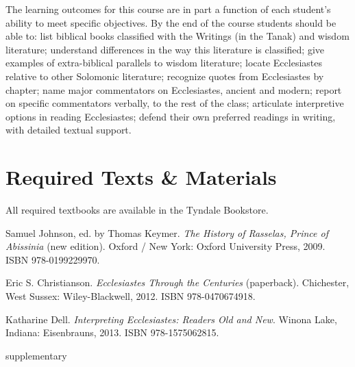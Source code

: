 \documentclass[titlepage]{article}
\begin{document}
The learning outcomes for this course are in part a function of each
student's ability to meet specific objectives. By the
end of the course students should be able to:
	list biblical books classified with the Writings (in the Tanak) and wisdom literature;
	understand differences in the way this literature is classified;
	give examples of extra-biblical parallels to wisdom literature;
	locate Ecclesiastes relative to other Solomonic literature;
	recognize quotes from Ecclesiastes by chapter;
	name major commentators on Ecclesiastes, ancient and modern;
	report on specific commentators verbally, to the rest of the class;
	articulate interpretive options in reading Ecclesiastes;
	defend their own preferred readings in writing, with detailed textual support.

\section{Required Texts \& Materials}
\label{texts}

All required textbooks are available in the Tyndale Bookstore.

\begingroup
\renewcommand{\section}[2]{}%
\begin{thebibliography}{Christianson}%

	 Samuel Johnson, ed. by Thomas Keymer.
	\emph{The History of Rasselas, Prince of Abissinia} (new edition).
	Oxford / New York: Oxford University Press, 2009.
	ISBN 978-0199229970.

	 Eric S. Christianson.
    \emph{Ecclesiastes Through the Centuries} (paperback).
    Chichester, West Sussex: Wiley-Blackwell, 2012.
	ISBN 978-0470674918.

	 Katharine Dell.
	\emph{Interpreting Ecclesiastes: Readers Old and New}.
	Winona Lake, Indiana: Eisenbrauns, 2013.
	ISBN 978-1575062815.

\end{thebibliography}
\endgroup

\section{Supplementary Texts}
\label{supplementary}
\end{document}
